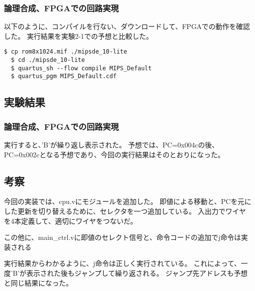 \subsubsection{論理合成、FPGAでの回路実現}
以下のように、コンパイルを行ない、ダウンロードして、FPGAでの動作を確認した。
実行結果を実験2-1での予想と比較した。

\begin{lstlisting}[caption={コンパイル、ダウンロード},label={コンパイル、ダウンロード2-2}]
  $ cp rom8x1024.mif ./mipsde_10-lite
  $ cd ./mipsde_10-lite
  $ quartus_sh --flow compile MIPS_Default
  $ quartus_pgm MIPS_Default.cdf 
\end{lstlisting}

\subsection{実験結果}
\subsubsection{論理合成、FPGAでの回路実現}
実行すると、'B'が繰り返し表示された。
予想では、PC=0x004cの後、PC=0x002cとなる予想であり、今回の実行結果はそのとおりになった。

\subsection{考察}
今回の実装では、cpu.vにモジュールを追加した。
即値による移動と、PCを元にした更新を切り替えるために、セレクタを一つ追加している。
入出力でワイヤを4本定義して、適切にワイヤをつないだ。

この他に、main\_ctrl.vに即値のセレクト信号と、命令コードの追加でj命令は実装される

実行結果からわかるように、j命令は正しく実行されている。
これによって、一度'B'が表示された後もジャンプして繰り返される。
ジャンプ先アドレスも予想と同じ結果になった。
